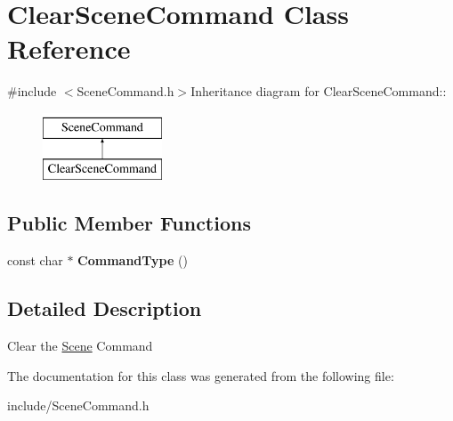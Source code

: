 \hypertarget{class_clear_scene_command}{
\section{ClearSceneCommand Class Reference}
\label{class_clear_scene_command}
}


{\ttfamily \#include $<$SceneCommand.h$>$}Inheritance diagram for ClearSceneCommand::\begin{figure}[H]
\begin{center}
\leavevmode
\includegraphics[height=2cm]{class_clear_scene_command}
\end{center}
\end{figure}
\subsection*{Public Member Functions}
\begin{DoxyCompactItemize}
\item 
\hypertarget{class_clear_scene_command_a7222b7892fe3390ae969bdf8dd978cd5}{
const char $\ast$ {\bfseries CommandType} ()}
\label{class_clear_scene_command_a7222b7892fe3390ae969bdf8dd978cd5}

\end{DoxyCompactItemize}


\subsection{Detailed Description}
Clear the \hyperlink{class_scene}{Scene} Command 

The documentation for this class was generated from the following file:\begin{DoxyCompactItemize}
\item 
include/SceneCommand.h\end{DoxyCompactItemize}
